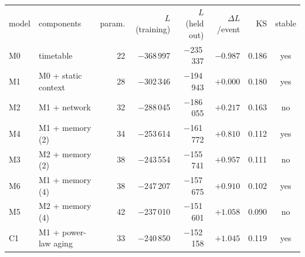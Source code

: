\begin{ruledtabular}
\begin{tabular}{llrrrrrc}
model & components & param. & $L$ (training) & $L$ (held out) & $\Delta L$/event & KS & stable \\
\colrule
M0 & timetable & 22 & $-$368\,997 & $-$235\,337 & $-0.987$ & 0.186 & yes \\
M1 & M0 + static context & 28 & $-$302\,346 & $-$194\,943 & $+0.000$ & 0.180 & yes \\
M2 & M1 + network & 32 & $-$288\,045 & $-$186\,055 & $+0.217$ & 0.163 & no \\
M4 & M1 + memory (2) & 34 & $-$253\,614 & $-$161\,772 & $+0.810$ & 0.112 & yes \\
M3 & M2 + memory (2) & 38 & $-$243\,554 & $-$155\,741 & $+0.957$ & 0.111 & no \\
M6 & M1 + memory (4) & 38 & $-$247\,207 & $-$157\,675 & $+0.910$ & 0.102 & yes \\
M5 & M2 + memory (4) & 42 & $-$237\,010 & $-$151\,601 & $+1.058$ & 0.090 & no \\
C1 & M1 + power-law aging & 33 & $-$240\,850 & $-$152\,158 & $+1.045$ & 0.119 & yes \\
\end{tabular}
\end{ruledtabular}
